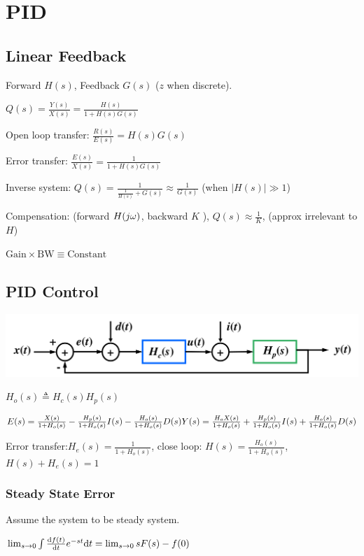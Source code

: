 \section{PID}

\subsection*{Linear Feedback}
Forward $H(s)$, Feedback $G(s)$ ($z$ when discrete).

$Q(s) = \frac{Y(s)}{X(s)} = \frac{H(s)}{1+H(s)G(s)}$

Open loop transfer: $\frac{R(s)}{E(s)} = H(s) G(s)$

Error transfer: $\frac{E(s)}{X(s)} = \frac{1}{1 + H(s) G(s)}$

Inverse system: $Q(s) = \frac{1}{\frac{1}{H(s)} + G(s)} \approx \frac{1}{G(s)}$ (when $|H(s)| \gg 1$)

Compensation: (forward $H(j\omega)$, backward $K$ ), $Q(s) \approx \frac 1 K$, (approx irrelevant to $H$)

$\text{Gain} \times \text{BW} \equiv \text{Constant}$

\subsection*{PID Control}

\includegraphics[scale=0.25]{inhalt/pid.png}

$H_o(s) \triangleq H_c(s) H_p(s)$

$E(s) = \frac{X(s)}{1+H_o(s)} - \frac{H_p(s)}{1+H_o(s)} I(s) - \frac{H_o(s)}{1 + H_o(s)} D(s)\\ Y(s) = \frac{H_oX(s)}{1+H_o(s)} + \frac{H_p(s)}{1+H_o(s)} I(s) + \frac{H_o(s)}{1 + H_o(s)} D(s)$

Error transfer:$H_e(s) = \frac{1}{1+H_o(s)}$, close loop: $H(s) = \frac{H_o(s)}{1 + H_o(s)}$, $H(s)+H_e(s) = 1$


\subsubsection*{Steady State Error}
Assume the system to be steady system.

$\lim_{s\to 0}\int \frac{\mathrm{d} f(t)}{\mathrm{d} t}e^{-st}\mathrm{d} t = \lim_{s\to 0}sF(s) - f(0)$

